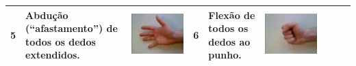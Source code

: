 \begin{table}[htb]
\begin{tabular}{m{0.5cm} m{1.5cm} m{2cm} | m{0.5cm} m{1.5cm} m{2cm} | m{0.5cm} m{1.5cm} m{2cm}}
		5	&	Abdução (``afastamento'') de todos os dedos extendidos.	& \includegraphics[width=\linewidth]{./img/moves/mov5.png} &
		6	&	Flexão de todos os dedos ao punho.	& \includegraphics[width=\linewidth]{./img/moves/mov6.png}\\
		\midrule

\end{tabular}
\end{table}
